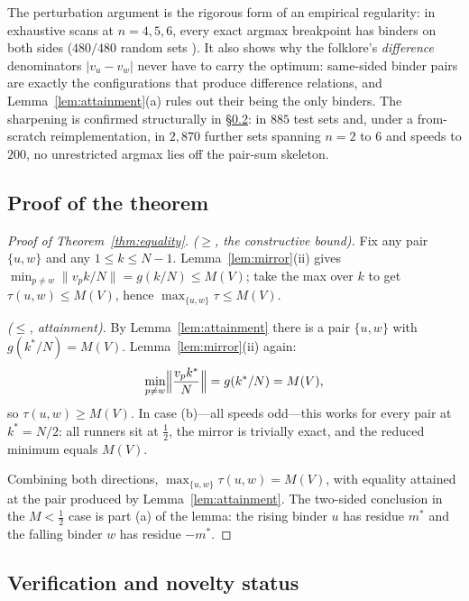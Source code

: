 \begin{remark}\label{rem:twosided}
The perturbation argument is the rigorous form of an empirical
regularity: in exhaustive scans at $n=4,5,6$, every exact argmax
breakpoint has binders on both sides ($480/480$ random sets
\cite{prog-artifacts}). It also shows why the folklore's
\emph{difference} denominators $|v_u-v_w|$ never have to carry the
optimum: same-sided binder pairs are exactly the configurations that
produce difference relations, and Lemma~\ref{lem:attainment}(a) rules out
their being the only binders. The sharpening is confirmed structurally in
\S\ref{sec:equality-verify}: in $885$ test sets and, under a from-scratch
reimplementation, in $2{,}870$ further sets spanning $n=2$ to $6$ and
speeds to $200$, no unrestricted argmax lies off the pair-sum skeleton.
\end{remark}

\subsection{Proof of the theorem}

\begin{proof}[Proof of Theorem~\ref{thm:equality}]
\emph{($\ge$, the constructive bound).} Fix any pair $\{u,w\}$ and any
$1\le k\le N-1$. Lemma~\ref{lem:mirror}(ii) gives
$\min_{p\ne w}\lVert v_p k/N\rVert=g(k/N)\le M(V)$; take the max over
$k$ to get $\tau(u,w)\le M(V)$, hence
$\max_{\{u,w\}}\tau\le M(V)$.

\emph{($\le$, attainment).} By Lemma~\ref{lem:attainment} there is a pair
$\{u,w\}$ with $g(k^\ast/N)=M(V)$. Lemma~\ref{lem:mirror}(ii) again:
\[
\min_{p\ne w}\Bigl\lVert \frac{v_p k^\ast}{N}\Bigr\rVert
=g(k^\ast/N)=M(V),
\]
so $\tau(u,w)\ge M(V)$. In case (b)---all speeds odd---this works for
every pair at $k^\ast=N/2$: all runners sit at $\tfrac12$, the mirror is
trivially exact, and the reduced minimum equals $M(V)$.

Combining both directions, $\max_{\{u,w\}}\tau(u,w)=M(V)$, with equality
attained at the pair produced by Lemma~\ref{lem:attainment}. The
two-sided conclusion in the $M<\tfrac12$ case is part (a) of the lemma:
the rising binder $u$ has residue $m^\ast$ and the falling binder $w$ has
residue $-m^\ast$.
\end{proof}

\subsection{Verification and novelty status}\label{sec:equality-verify}

